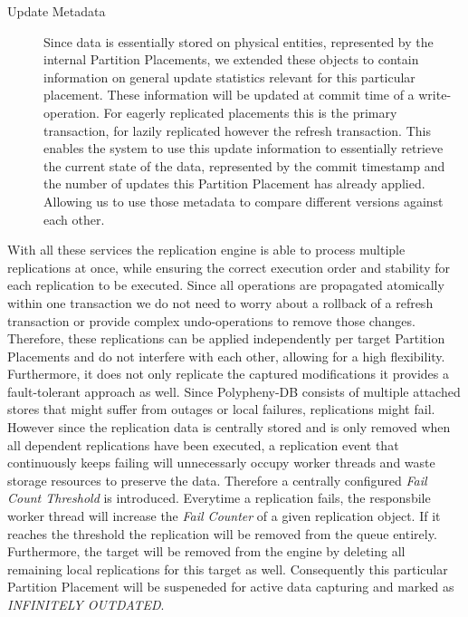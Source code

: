 \begin{description}
    \item[Update Metadata] Since data is essentially stored on physical entities, represented by the internal Partition Placements, we extended these objects 
    to contain information on general update statistics relevant for this particular placement. These information will be updated at commit time of a write-operation.
    For eagerly replicated placements this is the primary transaction, for lazily replicated however the refresh transaction.
    This enables the system to use this update information to essentially retrieve the current state of the data, represented by the commit timestamp
    and the number of updates this Partition Placement has already applied. Allowing us to use those metadata to compare different versions against each other.

\end{description}



With all these services the replication engine is able to process multiple replications at once, while ensuring the correct execution order and stability
for each replication to be executed. 
Since all operations are propagated atomically within one transaction we do not need to worry about a rollback of a refresh transaction or provide complex undo-operations 
to remove those changes. Therefore, these replications can be applied independently per target Partition Placements and do not interfere with each other, 
allowing for a high flexibility.\\
Furthermore, it does not only replicate the captured modifications it provides a fault-tolerant approach as well. 
Since Polypheny-DB consists of multiple attached stores that might suffer from outages or local failures, replications might fail.
However since the replication data is centrally stored and is only removed when all dependent replications have been executed, 
a replication event that continuously keeps failing will unnecessarly occupy worker threads and waste storage resources to preserve the data.
Therefore a centrally configured \emph{Fail Count Threshold} is introduced. Everytime a replication fails, the responsbile worker thread will increase the \textit{Fail Counter} 
of a given replication object. If it reaches the threshold the replication will be removed from the queue entirely. 
Furthermore, the target will be removed from the engine by deleting all remaining local replications for this target as well.
Consequently this particular Partition Placement will be suspeneded for active data capturing and marked as \emph{INFINITELY OUTDATED}.

